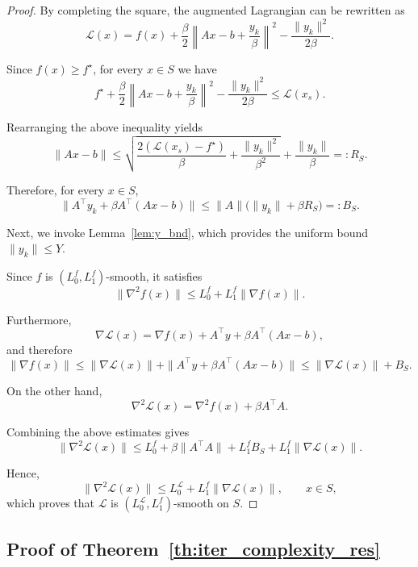 \documentclass[runningheads]{llncs}
\begin{document}
	\begin{proof}
		By completing the square, the augmented Lagrangian can be rewritten as
		\[
		\mathcal{L}(x)
		=
		f(x)
		+
		\frac{\beta}{2}
		\left\|
		Ax-b+\frac{y_k}{\beta}
		\right\|^2
		-
		\frac{\|y_k\|^2}{2\beta}.
		\]
		
		Since $f(x)\geq f^\star$, for every $x\in S$ we have
		\[
		f^\star
		+
		\frac{\beta}{2}
		\left\|
		Ax-b+\frac{y_k}{\beta}
		\right\|^2
		-
		\frac{\|y_k\|^2}{2\beta}
		\leq
		\mathcal{L}(x_s).
		\]
		
		Rearranging the above inequality yields
		\[
		\|Ax-b\|
		\leq
		\sqrt{
			\frac{2(\mathcal{L}(x_s)-f^\star)}{\beta}
			+
			\frac{\|y_k\|^2}{\beta^2}
		}
		+
		\frac{\|y_k\|}{\beta}
		=:R_S.
		\]
		
		Therefore, for every $x\in S$,
		\[
		\|A^\top y_k+\beta A^\top(Ax-b)\|
		\leq
		\|A\|
		\bigl(
		\|y_k\|
		+
		\beta R_S
		\bigr)
		=:B_S.
		\]
		
		Next, we invoke Lemma~\ref{lem:y_bnd}, which provides the uniform bound $\| y_k \| \leq Y$.
		
		Since $f$ is $(L_0^f,L_1^f)$-smooth, it satisfies
		\[
		\|\nabla^2 f(x)\|
		\leq
		L_0^f
		+
		L_1^f\|\nabla f(x)\|.
		\]
		
		Furthermore,
		\[
		\nabla \mathcal{L}(x)
		=
		\nabla f(x)
		+
		A^\top y
		+
		\beta A^\top(Ax-b),
		\]
		and therefore
		\[
		\|\nabla f(x)\|
		\leq
		\|\nabla \mathcal{L}(x)\|
		+
		\|A^\top y+\beta A^\top(Ax-b)\|
		\leq
		\|\nabla \mathcal{L}(x)\|
		+
		B_S.
		\]
		
		On the other hand,
		\[
		\nabla^2\mathcal{L}(x)
		=
		\nabla^2f(x)
		+
		\beta A^\top A.
		\]
		
		Combining the above estimates gives
		\[
		\|\nabla^2\mathcal{L}(x)\|
		\leq
		L_0^f
		+
		\beta\|A^\top A\|
		+
		L_1^f B_S
		+
		L_1^f\|\nabla\mathcal{L}(x)\|.
		\]
		
		Hence,
		\[
		\|\nabla^2\mathcal{L}(x)\|
		\leq
		L_0^{\mathcal{L}}
		+
		L_1^f\|\nabla\mathcal{L}(x)\|,
		\qquad x\in S,
		\]
		which proves that $\mathcal{L}$ is $(L_0^{\mathcal{L}}, L_1^{f})$-smooth on $S$.
	\end{proof}
	
	\subsection{Proof of Theorem~\ref{th:iter_complexity_res}}\label{sect:ap:th:iter_complexity_res}
	
\end{document}
